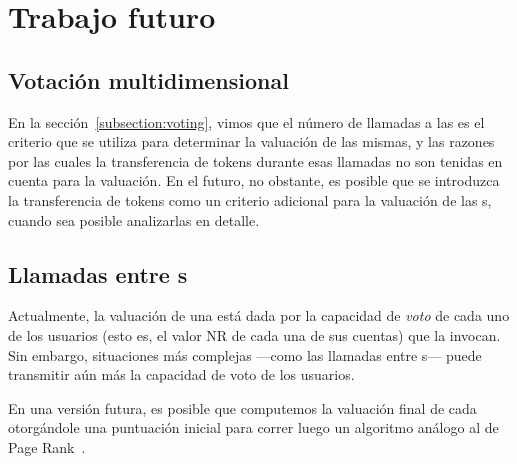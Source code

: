 \section{Trabajo futuro}

\subsection{Votación multidimensional}
\noindent
En la sección~\ref{subsection:voting}, vimos que el número de llamadas a las \dapp es el criterio que se utiliza para determinar la valuación de las mismas, y las razones por las cuales la transferencia de tokens durante esas llamadas no son tenidas en cuenta para la valuación. En el futuro, no obstante, es posible que se introduzca la transferencia de tokens como un criterio adicional para la valuación de las {\dapp}s, cuando sea posible analizarlas en detalle.

\subsection{Llamadas entre {\dapp}s}
\noindent
Actualmente, la valuación de una {\dapp} está dada por la capacidad de \textit{voto} de cada uno de los usuarios (esto es, el valor NR de cada una de sus cuentas) que la invocan. Sin embargo, situaciones más complejas —como las llamadas entre {\dapp}s— puede transmitir aún más la capacidad de voto de los usuarios.

En una versión futura, es posible que computemos la valuación final de cada \dapp
otorgándole una puntuación inicial para correr luego un algoritmo análogo al de Page Rank~\cite{page1999pagerank}.